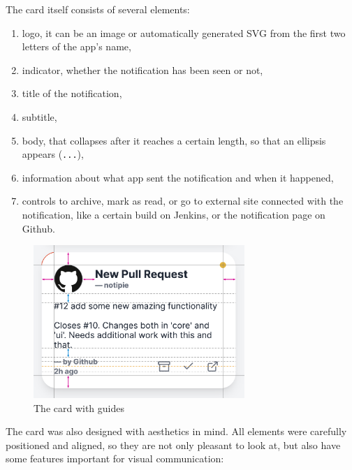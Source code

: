 The card itself consists of several elements:

\begin{enumerate}
  \item
    logo, it can be an image or automatically generated SVG from the first
    two letters of the app's name,
  \item
    indicator, whether the notification has been seen or not,
  \item
    title of the notification,
  \item
    subtitle,
  \item
    body, that collapses after it reaches a certain length, so that an
    ellipsis appears (\texttt{...}),
  \item
    information about what app sent the notification and when it happened,
  \item
    controls to archive, mark as read, or go to external site connected
    with the notification, like a certain build on Jenkins, or the
    notification page on Github.
\end{enumerate}

\begin{figure}
  \centering
  \includegraphics[width=8cm,keepaspectratio]{./img/card_guides.png}
  \caption{The card with guides}
\end{figure}

The card was also designed with aesthetics in mind. All elements were
carefully positioned and aligned, so they are not only pleasant to look
at, but also have some features important for visual communication:

